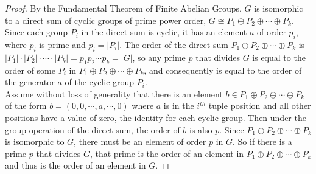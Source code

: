 \documentclass{article}
\begin{document}
\begin{proof}
    By the Fundamental Theorem of Finite Abelian Groups, $G$ is isomorphic to a direct 
    sum of cyclic groups of prime power order, $G \cong P_1 \oplus P_2 \oplus \cdots \oplus P_k$.  
    Since each group $P_i$ in the direct sum is cyclic, it has an element $a$ of order $p_i$, where 
    $p_i$ is prime and $p_i = |P_i|$.  The order of the direct sum $P_1 \oplus P_2 \oplus \cdots \oplus P_k$ 
    is $|P_1| \cdot |P_2| \cdot \cdots \cdot |P_k| = p_1 p_2 \cdots p_k = |G|$, so any prime $p$ that 
    divides $G$ is equal to the order of some $P_i$ in $P_1 \oplus P_2 \oplus \cdots \oplus P_k$, and 
    consequently is equal to the order of the generator $a$ of the cyclic group $P_i$.  \\ 

    Assume without loss of generality that there is an element $b \in P_1 \oplus P_2 \oplus \cdots \oplus P_k$ 
    of the form $b = (0, 0, \cdots, a, \cdots, 0)$ where $a$ is in the $i^{th}$ tuple position and all other 
    positions have a value of zero, the identity for each cyclic group.  Then under the group operation of the 
    direct sum, the order of $b$ is also $p$.  
    Since $P_1 \oplus P_2 \oplus \cdots \oplus P_k$ is isomorphic to $G$, there must be an element of order 
    $p$ in $G$.  So if there is a prime $p$ that divides $G$, that prime is the order of an element in $P_1 \oplus P_2 \oplus \cdots \oplus P_k$ 
    and thus is the order of an element in $G$.
\end{proof}
\end{document}
